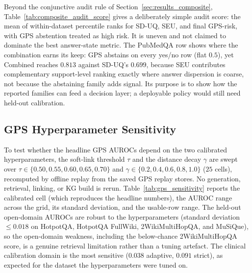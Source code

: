 Beyond the conjunctive audit rule of Section~\ref{sec:results_composite},
Table~\ref{tab:composite_audit_score} gives a deliberately simple audit score:
the mean of within-dataset percentile ranks for SD-UQ, SEU, and final GPS-risk,
with GPS abstention treated as high risk.
It is uneven and not claimed to dominate the best answer-state metric.
The PubMedQA row shows where the combination earns its keep: GPS abstains on
every yes/no row (flat $0.5$), yet Combined reaches $0.813$ against SD-UQ's
$0.699$, because SEU contributes complementary support-level ranking exactly
where answer dispersion is coarse, not because the abstaining family adds
signal.
Its purpose is to show how the reported families can feed a decision layer;
a deployable policy would still need held-out calibration.



\subsection{GPS Hyperparameter Sensitivity}
\label{sec:appendix_gps_sensitivity}

To test whether the headline GPS AUROCs depend on the two calibrated
hyperparameters, the soft-link threshold $\tau$ and the distance decay $\gamma$
are swept over $\tau \in \{0.50, 0.55, 0.60, 0.65, 0.70\}$ and
$\gamma \in \{0.2, 0.4, 0.6, 0.8, 1.0\}$ ($25$ cells), recomputed by offline
replay from the saved GPS replay stores. No generation, retrieval, linking, or KG
build is rerun.
Table~\ref{tab:gps_sensitivity} reports the calibrated cell (which reproduces
the headline numbers), the AUROC range across the grid, its standard deviation,
and the usable-row range.
The held-out open-domain AUROCs are robust to the hyperparameters (standard
deviation $\leq 0.018$ on HotpotQA, HotpotQA FullWiki, 2WikiMultiHopQA, and
MuSiQue), so the open-domain weakness, including the below-chance
2WikiMultiHopQA score, is a genuine retrieval limitation rather than a tuning
artefact.
The clinical calibration domain is the most sensitive ($0.038$ adaptive,
$0.091$ strict), as expected for the dataset the hyperparameters were tuned on.

